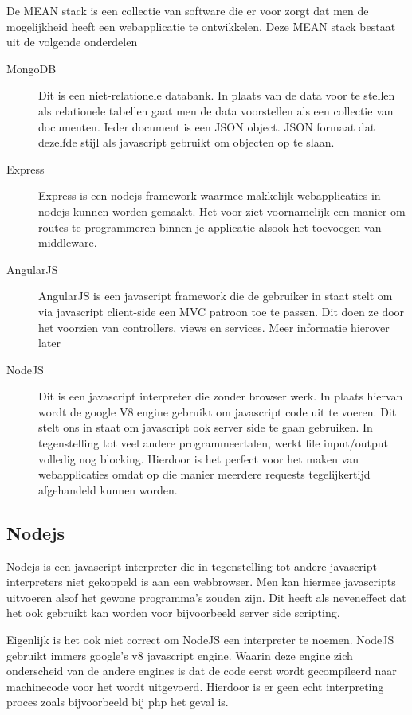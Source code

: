 \documentclass[a4paper,11pt]{article}
\begin{document}
De MEAN stack is een collectie van software die er voor zorgt dat men de mogelijkheid heeft een webapplicatie te ontwikkelen. Deze MEAN stack bestaat uit de volgende onderdelen

\begin{description}
\item[MongoDB] Dit is een niet-relationele databank. In plaats van de data voor te stellen als relationele tabellen gaat men de data voorstellen als een collectie van documenten. Ieder document is een JSON object. JSON formaat dat dezelfde stijl als javascript gebruikt om objecten op te slaan.
\item[Express] Express is een nodejs framework waarmee makkelijk webapplicaties in nodejs kunnen worden gemaakt. Het voor ziet voornamelijk een manier om routes te programmeren binnen je applicatie alsook het toevoegen van middleware.
\item[AngularJS] AngularJS is een javascript framework die de gebruiker in staat stelt om via javascript client-side een MVC patroon toe te passen. Dit doen ze door het voorzien van controllers, views en services. Meer informatie hierover later
\item[NodeJS] Dit is een javascript interpreter die zonder browser werk. In plaats hiervan wordt de google V8 engine gebruikt om javascript code uit te voeren. Dit stelt ons in staat om javascript ook server side te gaan gebruiken. In tegenstelling tot veel andere programmeertalen, werkt file input/output volledig nog blocking. Hierdoor is het perfect voor het maken van webapplicaties omdat op die manier meerdere requests tegelijkertijd afgehandeld kunnen worden.

\end{description}

\subsection{Nodejs}
Nodejs is een javascript interpreter die in tegenstelling tot andere javascript interpreters niet gekoppeld is aan een webbrowser. Men kan hiermee javascripts uitvoeren alsof het gewone programma's zouden zijn. Dit heeft als neveneffect dat het ook gebruikt kan worden voor bijvoorbeeld server side scripting.\cite{NodeJS}

Eigenlijk is het ook niet correct om NodeJS een interpreter te noemen. NodeJS gebruikt immers google's v8 javascript engine. Waarin deze engine zich onderscheid van de andere engines is dat de code eerst wordt gecompileerd naar machinecode voor het wordt uitgevoerd. Hierdoor is er geen echt interpreting proces zoals bijvoorbeeld bij php het geval is.
\end{document}
